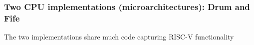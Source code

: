 \begin{frame}
\frametitle{Two CPU implementations (microarchitectures): Drum and Fife}

\begin{center}
\end{center}

The two implementations share much code capturing RISC-V functionality

\end{frame}


